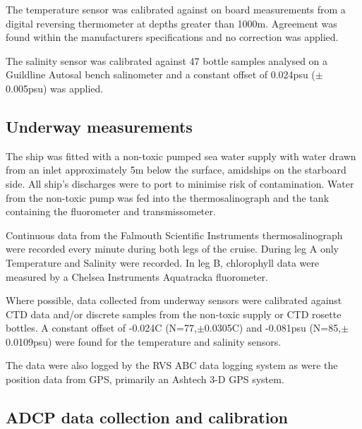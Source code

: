 The temperature sensor was calibrated against on board
measurements from a digital reversing thermometer at depths
greater than 1000m. Agreement was found within the manufacturers
specifications and no correction was applied.

The salinity sensor was calibrated against 47 bottle samples
analysed on a Guildline Autosal bench salinometer and a constant
offset of 0.024psu ($\pm$0.005psu) was applied.

\subsection{Underway measurements}

The ship was fitted with a non-toxic pumped sea water supply with
water drawn from an inlet approximately 5m below the surface,
amidships on the starboard side. All ship's discharges were to
port to minimise risk of contamination. Water from the non-toxic
pump was fed into the thermosalinograph and the tank containing
the fluorometer and transmissometer.

Continuous data from the Falmouth Scientific Instruments
thermosalinograph were recorded every minute during both legs of
the cruise. During leg A only Temperature and Salinity were
recorded. In leg B,  chlorophyll data were measured by a Chelsea
Instruments Aquatracka fluorometer.

Where possible, data collected from underway sensors were
calibrated against CTD data and/or discrete samples from the
non-toxic supply or CTD rosette bottles. A constant offset of
-0.024\deg C (N=77,$\pm$0.0305\deg C) and -0.081psu
(N=85,$\pm$0.0109psu) were found for the temperature and salinity
sensors.

The data were also logged by the RVS ABC data logging system as
were the position data from GPS, primarily an Ashtech 3-D GPS
system.

\subsection{ADCP data collection and calibration}
